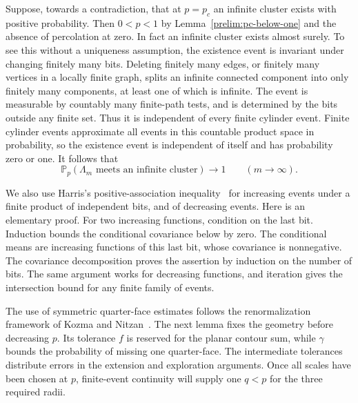 \documentclass[11pt]{article}
\theoremstyle{definition}
\theoremstyle{remark}
\numberwithin{equation}{section}
\begin{document}
Suppose, towards a contradiction, that at $p=p_c$ an infinite cluster exists
with positive probability. Then $0<p<1$ by Lemma~\ref{prelim:pc-below-one}
and the absence of percolation at zero. In fact an infinite cluster exists
almost surely. To see this without a uniqueness assumption, the existence event
is invariant under changing finitely many bits. Deleting finitely many edges,
or finitely many vertices in a locally finite graph, splits an infinite
connected component into only finitely many components, at least one of which
is infinite. The event is measurable by countably many finite-path tests, and
is determined by the bits outside any finite set. Thus it is independent of
every finite cylinder event. Finite cylinder events approximate all events
in this countable product space in probability, so the existence event is
independent of itself and has probability zero or one.
It follows that
\begin{equation}\label{prelim:seed-infinite}
 \mathbb P_p(\Lambda_m\text{ meets an infinite cluster})\longrightarrow1
 \qquad(m\longrightarrow\infty).
\end{equation}

We also use Harris's positive-association inequality~\cite{Harris1960}
for increasing events under a finite product
of independent bits, and of decreasing events. Here is an elementary proof.
For two increasing functions, condition on the last bit. Induction bounds the
conditional covariance below by zero. The conditional means are increasing
functions of this last bit, whose covariance is nonnegative. The covariance
decomposition proves the assertion by induction on the number of bits.
The same argument works for decreasing functions, and iteration gives the
intersection bound for any finite family of events.

The use of symmetric quarter-face estimates follows the renormalization
framework of Kozma and Nitzan~\cite[Section~4, Lemmas~8--9]{KozmaNitzan2024}.
The next lemma fixes the geometry before decreasing $p$. Its tolerance $f$
is reserved for the planar contour sum, while $\gamma$ bounds the probability
of missing one quarter-face. The intermediate tolerances distribute errors
in the extension and exploration arguments. Once all scales have been chosen
at $p$, finite-event continuity will supply one $q<p$ for the three required
radii.
\end{document}

